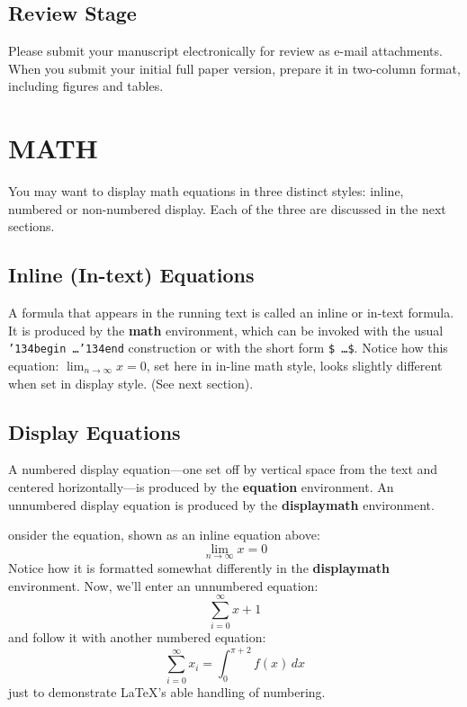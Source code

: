 \documentclass{jiveArticle}
\begin{document}
\subsection{Review Stage}
Please submit your manuscript electronically for review as e-mail attachments. When you submit your initial full paper version, prepare it in two-column format, including figures and tables. 



\section{MATH}
You may want to display math equations in three distinct styles:
inline, numbered or non-numbered display. Each of the three are
discussed in the next sections.

\subsection{Inline (In-text) Equations}
A formula that appears in the running text is called an inline or in-text formula.  It is produced by the \textbf{math} environment, which can be invoked with the usual \texttt{{\char'134}begin\,\ldots{\char'134}end} construction or with the short form \texttt{\$\,\ldots\$}.  Notice how this equation:
\begin{math}
\lim_{n\rightarrow \infty}x=0
\end{math}, set here in in-line math style, looks slightly different when set in display style.  (See next section).

\subsection{Display Equations}
A numbered display equation---one set off by vertical space from the text and centered horizontally---is produced by the \textbf{equation} environment. An unnumbered display equation is produced by the \textbf{displaymath} environment.

onsider the equation, shown as an inline equation above:
\begin{equation}
\lim_{n\rightarrow \infty}x=0
\end{equation}
Notice how it is formatted somewhat differently in
the \textbf{displaymath}
environment.  Now, we'll enter an unnumbered equation:
\begin{displaymath}
\sum_{i=0}^{\infty} x + 1
\end{displaymath}
and follow it with another numbered equation:
\begin{equation}
\sum_{i=0}^{\infty}x_i=\int_{0}^{\pi+2} f(x)\,dx
\end{equation}
just to demonstrate \LaTeX's able handling of numbering.
\end{document}
